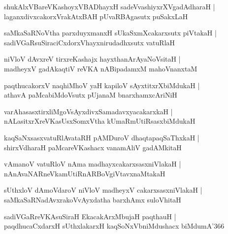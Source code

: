\documentclass[twoside,12pt,openright]{book}
\newcounter{shloka}[chapter]
\begin{document}
\begin{shloka}%
shukAlxVBareVKashoyxVBADhayxH sadeVvashiyxrXVgadAdharaH |\\
laganxdivxcakorxVrakAtxBAH pUvaRBAgasutx puSakxLaH
\end{shloka}

\begin{shloka}%
saMkaSaRNoVtha parxduyxmanxH sUkaSxmXcakarxsutx piVtakaH |\\
sadiVGaRsuSiraciCxdorxVhayxnirudadhxsutx vatuRlaH 
\end{shloka}

\begin{shloka}%
niVloV dAvxreV tirxreKashajx hayxthanArAyaNoVsitaH |\\
madheyxV gadAkaqtiV reVKA nABipadamxM mahoVnanxtaM 
\end{shloka}

\begin{shloka}%
paqthucakorxV naqhiMhoV yaH kapiloV sAyxtitxrXbiMdukaH |\\
athavA paMcabiMdoVsutx pUjanaM bnarxhamxcAriNiH 
\end{shloka}

\begin{shloka}%
varAhasasxtirxliMgoVsAyxdivxSamadavxyacakarxkaH |\\
nALasitxrXreVKasUsxSomxVtha kUmaRmUtiRsasxbiMdukaH 
\end{shloka}

\begin{shloka}%
kaqSaNxsasxvatuRlAvataRH pAMDuroV dhaqtapaqSaThxkaH |\\
shirxVdharaH paMcareVKashacx vanamAliV gadAMkitaH 
\end{shloka}

\begin{shloka}%
vAmanoV vatuRloV nAma madhayxcakarxsasxniVlakaH |\\
nAnAvaNARneVkamUtiRnARBoVgiVtavxnaMtakaH 
\end{shloka}

\begin{shloka}%
sUthxloV dAmoVdaroV niVloV madheyxV cakarxsasxniVlakaH |\\
saMkaSaRNadAvxrakoVvAyxdatha barxhAmx suloVhitaH 
\end{shloka}

\begin{shloka}%
sadiVGaRreVKAsuSiraH EkacakArxMbujaH paqthauH |\\
paqdhucaCxdarxH sUthxlakarxH kaqSoNxVbniMdushacx biMdumA\char'366
\end{shloka}
\end{document}
